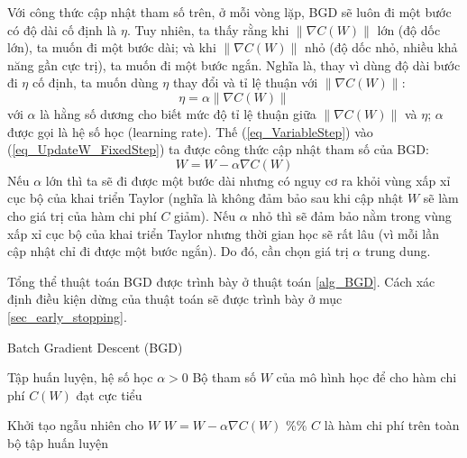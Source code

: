 Với công thức cập nhật tham số trên, ở mỗi vòng lặp, BGD sẽ luôn đi một bước có độ dài cố định là $\eta$. Tuy nhiên, ta thấy rằng khi $\|\nabla C(W)\|$ lớn (độ dốc lớn), ta muốn đi một bước dài; và khi $\|\nabla C(W)\|$ nhỏ (độ dốc nhỏ, nhiều khả năng gần cực trị), ta muốn đi một bước ngắn. Nghĩa là, thay vì dùng độ dài bước đi $\eta$ cố định, ta muốn dùng $\eta$ thay đổi và tỉ lệ thuận với $\|\nabla C(W)\|$:
\begin{equation}
	\eta = \alpha \|\nabla C(W)\|
	\label{eq_VariableStep}
\end{equation}
với $\alpha$ là hằng số dương cho biết mức độ tỉ lệ thuận giữa $\|\nabla C(W)\|$ và $\eta$; $\alpha$ được gọi là hệ số học (learning rate). Thế (\ref{eq_VariableStep}) vào (\ref{eq_UpdateW_FixedStep}) ta được công thức cập nhật tham số của BGD:
\begin{equation}
	W = W - \alpha \nabla C(W)
	\label{eq_UpdateW_VariabeStep}
\end{equation}
Nếu $\alpha$ lớn thì ta sẽ đi được một bước dài nhưng có nguy cơ ra khỏi vùng xấp xỉ cục bộ của khai triển Taylor (nghĩa là không đảm bảo sau khi cập nhật $W$ sẽ làm cho giá trị của hàm chi phí $C$ giảm). Nếu $\alpha$ nhỏ thì sẽ đảm bảo nằm trong vùng xấp xỉ cục bộ của khai triển Taylor nhưng thời gian học sẽ rất lâu (vì mỗi lần cập nhật chỉ đi được một bước ngắn). Do đó, cần chọn giá trị $\alpha$ trung dung.


Tổng thể thuật toán BGD được trình bày ở thuật toán \ref{alg_BGD}. Cách xác định điều kiện dừng của thuật toán sẽ được trình bày ở mục \ref{sec_early_stopping}.
\begin{algorithm}
	\caption{Batch Gradient Descent (BGD)}
	\label{alg_BGD}
	\begin{algorithmic}[1]
		\renewcommand{\algorithmicrequire}{\textbf{Đầu vào:}}
		\renewcommand{\algorithmicensure}{\textbf{Đầu ra:}}
		\algnewcommand{}
		\algnewcommand\Operation{\item[\algorithmicoperation]}
		
		\Require Tập huấn luyện, hệ số học $\alpha>0$
		\Ensure Bộ tham số $W$ của mô hình học để cho hàm chi phí $C(W)$ đạt cực tiểu
		
		\Operation
		\State Khởi tạo ngẫu nhiên cho $W$
			\State $W = W - \alpha \nabla C(W)$ \%\% $C$ là hàm chi phí trên toàn bộ tập huấn luyện
		\EndWhile
	\end{algorithmic}
\end{algorithm}
